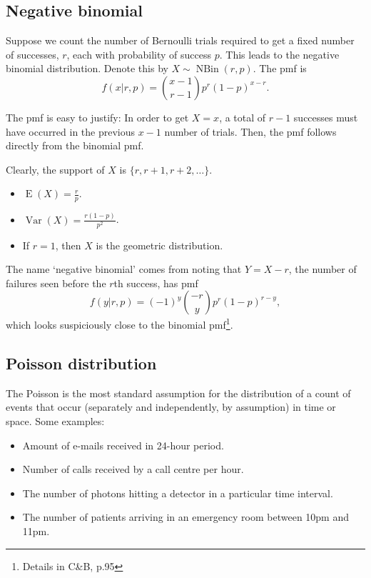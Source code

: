 \documentclass[
]{book}
\providecommand{\tightlist}{%
  \setlength{\itemsep}{0pt}\setlength{\parskip}{0pt}}
\DeclareMathOperator{\E}{E}
\DeclareMathOperator{\Var}{Var}
\DeclareMathOperator{\NBin}{NBin}
\theoremstyle{definition}
\theoremstyle{definition}
\theoremstyle{definition}
\theoremstyle{definition}
\theoremstyle{remark}
\begin{document}
\hypertarget{negative-binomial}{%
\subsection{Negative binomial}\label{negative-binomial}}

Suppose we count the number of Bernoulli trials required to get a fixed number of successes, \(r\), each with probability of success \(p\).
This leads to the negative binomial distribution.
Denote this by \(X\sim\NBin(r,p)\). The pmf is
\[
  f(x|r,p)= {x-1 \choose r-1} p^r (1-p)^{x-r}.
\]

The pmf is easy to justify: In order to get \(X=x\), a total of \(r-1\) successes must have occurred in the previous \(x-1\) number of trials. Then, the pmf follows directly from the binomial pmf.

Clearly, the support of \(X\) is \(\{r, r+1, r+2, \dots \}\).

\begin{itemize}
\tightlist
\item
  \(\E(X)=\frac{r}{p}\).
\item
  \(\Var(X)=\frac{r(1-p)}{p^2}\).
\item
  If \(r=1\), then \(X\) is the geometric distribution.
\end{itemize}

The name `negative binomial' comes from noting that \(Y=X-r\), the number of failures seen before the \(r\)th success, has pmf
\[
  f(y|r,p) = (-1)^y{-r \choose y} p^r(1-p)^{r-y},
\]
which looks suspiciously close to the binomial pmf\footnote{Details in C\&B, p.95}.

\hypertarget{poisson-distribution}{%
\subsection{Poisson distribution}\label{poisson-distribution}}

The Poisson is the most standard assumption for the distribution of a count of events that occur (separately and independently, by assumption) in time or space. Some examples:

\begin{itemize}
\tightlist
\item
  Amount of e-mails received in 24-hour period.
\item
  Number of calls received by a call centre per hour.
\item
  The number of photons hitting a detector in a particular time interval.
\item
  The number of patients arriving in an emergency room between 10pm and 11pm.
\end{itemize}
\end{document}
